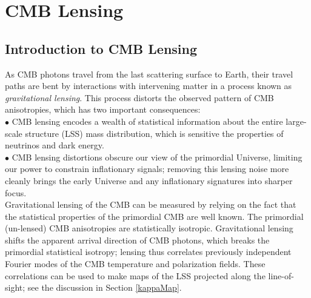  
\chapter{CMB Lensing}


\def\nnu{N_{\mathrm eff}}
\def\gtrsim{\raise-.75ex\hbox{$\buildrel>\over\sim$}}
\section{Introduction to CMB Lensing}
\label{sec:lensing_intro}

As CMB photons travel from the last scattering surface to Earth, their travel paths are bent by interactions with intervening matter in a process known as \textit{gravitational lensing}.
This process distorts the observed pattern of CMB anisotropies, which has two important consequences:\\
 
$\bullet$ CMB lensing encodes a wealth of statistical information about the entire large-scale structure (LSS) mass distribution, which is sensitive the properties of neutrinos and dark energy.\\

$\bullet$ CMB lensing distortions obscure our view of the primordial Universe, limiting our power to constrain inflationary signals; removing this lensing noise more cleanly brings the early Universe and any inflationary signatures into sharper focus.\\


Gravitational lensing of the CMB can be measured by relying on the fact that the statistical properties of the primordial CMB are well known.
The primordial (un-lensed) CMB anisotropies are statistically isotropic.
Gravitational lensing shifts the apparent arrival direction of CMB photons, which breaks the primordial statistical isotropy;
lensing thus correlates previously independent Fourier modes of the CMB temperature and polarization fields.
These correlations can be used to make maps of the LSS projected along the line-of-sight; see the discussion in Section \ref{kappaMap}.

